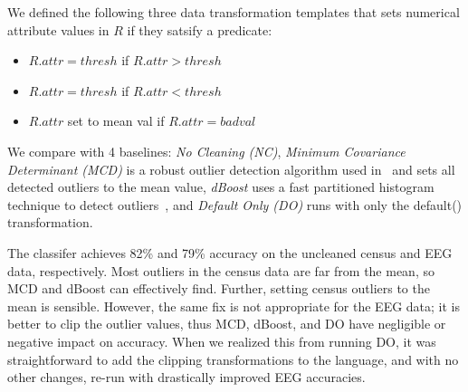 


We defined the following three data transformation templates that sets numerical attribute values in $R$ if they satsify a predicate:

{\small
\begin{itemize}
  \item {} $R.attr = thresh$ if $R.attr>thresh$
  \item {} $R.attr = thresh$ if $R.attr<thresh$
  \item {} $R.attr$ set to mean val if $R.attr=badval$
\end{itemize}
}

 We compare with 4 baselines: {\it No Cleaning (NC)}, {\it Minimum Covariance Determinant (MCD)} is a robust outlier detection algorithm used in~\cite{bailis2016macrobase} and sets all detected outliers to the mean value, {\it dBoost} uses a fast partitioned histogram technique to detect outliers~\cite{mariet2016outlier}, and {\it Default Only (DO)} runs \sys with only the \textsf{default()} transformation.  

 The classifer achieves 82\% and 79\% accuracy on the uncleaned census and EEG data, respectively.  Most outliers in the census data are far from the mean, so MCD and dBoost can effectively find.  Further, setting census outliers to the mean is sensible. However, the same fix is not appropriate for the EEG data; it is better to clip the outlier values, thus MCD, dBoost, and DO have negligible or negative impact on accuracy.  When we realized this from running DO, it was straightforward to add the clipping transformations to the language, and with no other changes, re-run \sys with drastically improved EEG accuracies.  

